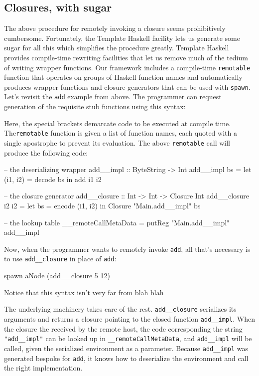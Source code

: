 \documentclass[preprint]{sigplanconf}
\begin{document}
\subsection{Closures, with sugar}

The above procedure for remotely invoking a closure seems prohibitively cumbersome. Fortunately, the Template Haskell facility lets us generate some sugar for all this which simplifies the procedure greatly. Template Haskell provides compile-time rewriting facilities that let us remove much of the tedium of writing wrapper functions. Our framework includes a compile-time \texttt{remotable} function that operates on groups of Haskell function names and automatically produces wrapper functions and closure-generators that can be used with \texttt{spawn}. Let's revisit the \texttt{add} example from above. The programmer can request generation of the requisite stub functions using this syntax:


Here, the special brackets \textt{$( )} demarcate code to be executed at compile time. The\texttt{remotable} function is given a list of function names, each quoted with a single apostrophe to prevent its evaluation. The above \texttt{remotable} call will produce the following code:

\begin{code}
-- the deserializing wrapper
add__impl :: ByteString -> Int
add__impl bs = let (i1, i2) = decode bs
                in add i1 i2

-- the closure generator
add__closure :: Int -> Int -> Closure Int
add__closure i2 i2 = let bs = encode (i1, i2)
                      in Closure "Main.add__impl" bs

-- the lookup table
__remoteCallMetaData = putReg "Main.add__impl" add__impl
\end{code}

Now, when the programmer wants to remotely invoke \texttt{add}, all that's necessary is to use \texttt{add\_\_closure} in place of \texttt{add}:

\begin{code}
spawn aNode (add__closure 5 12)
\end{code}

Notice that this syntax isn't very far from blah blah

The underlying machinery takes care of the rest. \texttt{add\_\_closure} serializes its arguments and returns a closure pointing to the closed function \texttt{add\_\_impl}. When the closure the received by the remote host, the code corresponding the string \texttt{"add\_\_impl"} can be looked up in \texttt{\_\_remoteCallMetaData}, and \texttt{add\_\_impl} will be called, given the serialized environment as a parameter. Because \texttt{add\_\_impl} was generated bespoke for \texttt{add}, it knows how to deserialize the environment and call the right implementation.
\end{document}
